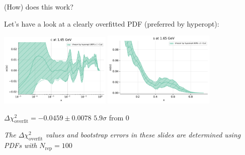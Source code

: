 \documentclass[aspectratio=169,11pt]{beamer}
\begin{document}
\begin{frame}[t]{(How) does this work?}

  Let's have a look at a clearly overfitted PDF (preferred by hyperopt):

  \begin{center}
    \includegraphics[width=0.4\textwidth]{hyperopt_choice_charm_plot_pdfs_c.pdf}
    \includegraphics[width=0.4\textwidth]{hyperopt_choice_strange_plot_pdfs_s.pdf}
  \end{center}

  \begin{center}
    $\Delta\chi^2_{\text{overfit}}=-0.0459 \pm 0.0078$ \quad $5.9\sigma$ from 0
  \end{center}
  \textit{The $\Delta\chi^2_{\text{overfit}}$ values and bootstrap errors in these slides are determined using PDFs with $N_{\text{rep}}=100$}

\end{frame}
\end{document}
